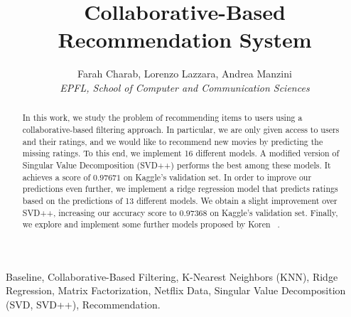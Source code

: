 \documentclass[10pt,conference,compsocconf]{IEEEtran}
\begin{document}
\title{Collaborative-Based Recommendation System}

\author{
  Farah Charab, Lorenzo Lazzara, Andrea Manzini\\
  \textit{EPFL, School of Computer and Communication Sciences}
}

\maketitle

\begin{abstract}
	In this work, we study the problem of recommending items to users using a collaborative-based filtering approach. In particular, we are only given access to users and their ratings, and we would like to recommend new movies by predicting the missing ratings. To this end, we implement 16 different models. A modified version of Singular Value Decomposition (SVD++) performs the best among these models. It achieves a score of $0.97671$ on Kaggle's validation set. In order to improve our predictions even further, we implement a ridge regression model that predicts ratings based on the predictions of 13 different models. We obtain a slight improvement over SVD++, increasing our accuracy score to $0.97368$ on Kaggle's validation set. Finally, we explore and implement some further models proposed by Koren ~\cite{koren2010factor}.
\end{abstract}
\begin{IEEEkeywords}
Baseline, Collaborative-Based Filtering, K-Nearest Neighbors (KNN), Ridge Regression, Matrix Factorization, Netflix Data, Singular Value Decomposition (SVD, SVD++), Recommendation.
\end{IEEEkeywords}
\end{document}
